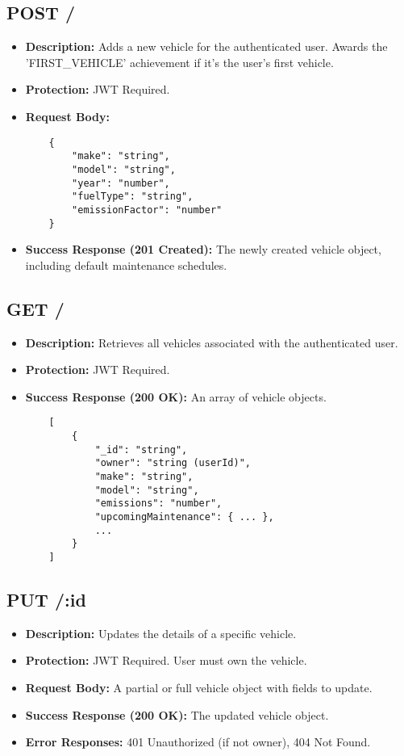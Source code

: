 \subsection{POST /}
\begin{itemize}
    \item \textbf{Description:} Adds a new vehicle for the authenticated user. Awards the 'FIRST\_VEHICLE' achievement if it's the user's first vehicle.
    \item \textbf{Protection:} JWT Required.
    \item \textbf{Request Body:}
    \begin{verbatim}
    {
        "make": "string",
        "model": "string",
        "year": "number",
        "fuelType": "string",
        "emissionFactor": "number"
    }
    \end{verbatim}
    \item \textbf{Success Response (201 Created):} The newly created vehicle object, including default maintenance schedules.
\end{itemize}

\subsection{GET /}
\begin{itemize}
    \item \textbf{Description:} Retrieves all vehicles associated with the authenticated user.
    \item \textbf{Protection:} JWT Required.
    \item \textbf{Success Response (200 OK):} An array of vehicle objects.
    \begin{verbatim}
    [
        {
            "_id": "string",
            "owner": "string (userId)",
            "make": "string",
            "model": "string",
            "emissions": "number",
            "upcomingMaintenance": { ... },
            ...
        }
    ]
    \end{verbatim}
\end{itemize}

\subsection{PUT /:id}
\begin{itemize}
    \item \textbf{Description:} Updates the details of a specific vehicle.
    \item \textbf{Protection:} JWT Required. User must own the vehicle.
    \item \textbf{Request Body:} A partial or full vehicle object with fields to update.
    \item \textbf{Success Response (200 OK):} The updated vehicle object.
    \item \textbf{Error Responses:} 401 Unauthorized (if not owner), 404 Not Found.
\end{itemize}

